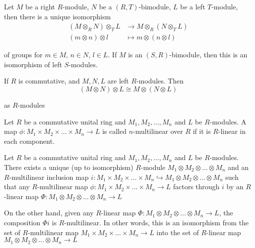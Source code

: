 \begin{theorem}
	Let $M$ be a right $R$-module, $N$ be a $(R, T)$-bimodule, $L$ be a left $T$-module, then there is a unique isomorphism 
	\begin{align*}
		(M \otimes_R N) \otimes_T L &\to M \otimes_R (N \otimes_T L) \\
		(m \otimes n) \otimes l &\mapsto m \otimes (n \otimes l)
	\end{align*}
	
	of groups for $m \in M$, $n \in N$, $l \in L$. If $M$ is an $(S, R)$-bimodule, then this is an isomorphism of left $S$-modules.
\end{theorem}

\begin{corollary}
	If $R$ is commutative, and $M, N, L$ are left $R$-modules. Then
	$$
		(M \otimes N) \otimes L \cong M \otimes (N \otimes L)
	$$
	
	as $R$-modules
\end{corollary}


\begin{definition}
	Let $R$ be a commutative unital ring and $M_1, M_2, ..., M_n$ and $L$ be $R$-modules. A map $\phi: M_1 \times M_2 \times ... \times M_n \to L$ is called $n$-multilinear over $R$ if it is $R$-linear in each component.
\end{definition}

\begin{corollary}
	Let $R$ be a commutative unital ring and $M_1, M_2, ..., M_n$ and $L$ be $R$-modules. There exists a unique (up to isomorphism) $R$-module $M_1 \otimes M_2 \otimes ... \otimes M_n$ and an $R$-multilinear inclusion map $i: M_1 \times M_2 \times ... \times M_n \hookrightarrow M_1 \otimes M_2 \otimes ... \otimes M_n$ such that any $R$-multilinear map $\phi: M_1 \times M_2 \times ... \times M_n \to L$ factors through $i$ by an $R$-linear map $\Phi: M_1 \otimes M_2 \otimes ... \otimes M_n \to L$
	\begin{center}
	\end{center}
	
	On the other hand, given any $R$-linear map $\Phi: M_1 \otimes M_2 \otimes ... \otimes M_n \to L$, the composition $\Phi i$ is $R$-multilinear. In other words, this is an isomorphism from the set of $R$-multilinear map $M_1 \times M_2 \times ... \times M_n \to L$ into the set of $R$-linear map $M_1 \otimes M_2 \otimes ... \otimes M_n \to L$
\end{corollary}

